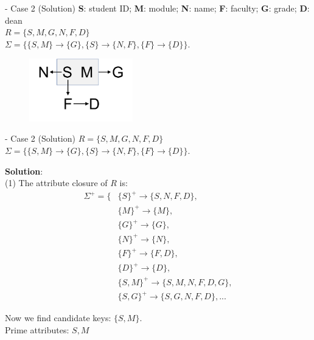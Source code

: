 \begin{frame}[fragile]{ - Case 2 (Solution)}
	\textbf{S}: student ID; \textbf{M}: module; \textbf{N}: name;
	\textbf{F}: faculty; \textbf{G}: grade; \textbf{D}: dean\\\vspace{5pt}
	$R = \{S, M, G, N, F, D\}$\\
	$\Sigma = \{\{S, M\} \rightarrow \{G\}, 
	\{S\} \rightarrow \{N, F\},
	\{F\} \rightarrow \{D\}\}$.\\\vspace{15pt}
	\begin{figure}
		\includegraphics[width=0.4\textwidth, trim=0 0 0 0, clip]{t5/images/case2.png}
	\end{figure}\vspace{-5pt}
\end{frame}

\begin{frame}[fragile]{ - Case 2 (Solution)}
	$R = \{S, M, G, N, F, D\}$\\
	$\Sigma = \{\{S, M\} \rightarrow \{G\}, 
	\{S\} \rightarrow \{N, F\},
	\{F\} \rightarrow \{D\}\}$.\\\vspace{5pt}
	
	\textbf{Solution}:\\
	(1) The attribute closure of $R$ is:
	\begin{align*} 
		\Sigma^{+} = \{&\{S\}^{+} \rightarrow \{S, N, F, D\},\\
		&\{M\}^{+} \rightarrow \{M\},\\
		&\{G\}^{+} \rightarrow \{G\},\\
		&\{N\}^{+} \rightarrow \{N\},\\
		&\{F\}^{+} \rightarrow \{F, D\},\\
		&\{D\}^{+} \rightarrow \{D\},\\
		&\{{S, M}\}^{+} \rightarrow \{S, M, N, F, D, G\},\\
		&\{{S, G}\}^{+} \rightarrow \{S, G, N, F, D\}, ...
	\end{align*} 
	
	Now we find candidate keys: $\{S, M\}$.\\
	Prime attributes: $S, M$
\end{frame}

